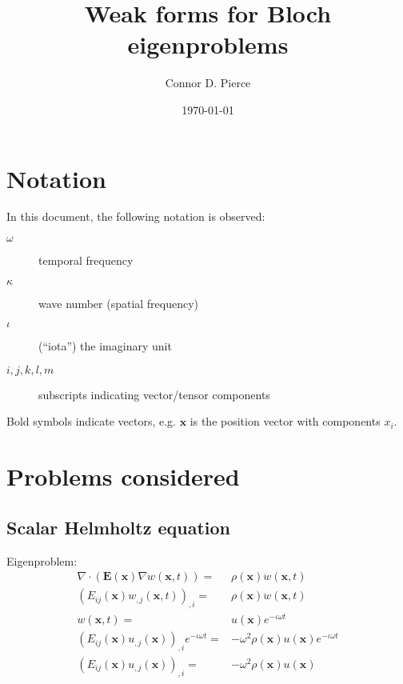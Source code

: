 \documentclass{article}
\title{Weak forms for Bloch eigenproblems}
\author{Connor D. Pierce}
\date{\today}
\numberwithin{equation}{section}
\newcommand{\imag}{\iota}
\newcommand{\vect}[1]{\boldsymbol{#1}}
\newcommand{\x}{x}
\newcommand{\vecx}{\vect{\x}}
\newcommand{\wavenum}{\kappa}
\begin{document}
\maketitle
\tableofcontents


\section{Notation}

In this document, the following notation is observed:
%
\begin{description}
    \item[$\omega$] temporal frequency
    \item[$\wavenum$] wave number (spatial frequency)
    \item[$\imag$] (``iota'') the imaginary unit
    \item[$i,j,k,l,m$] subscripts indicating vector/tensor components
\end{description}
%
Bold symbols indicate vectors, e.g. \(\vecx\) is the position vector with components \(\x_{i}\).


\section{Problems considered} \label{sec:prob}


\subsection{Scalar Helmholtz equation} \label{sec:prob.scalar}

Eigenproblem:
%
\begin{align}
    \nabla \cdot \left(
    \boldsymbol{E}(\vecx) \nabla w(\vecx, t)
    \right) =& \rho(\vecx) \ddot{w}(\vecx, t) \nonumber \\
    \left(
    E_{ij}(\vecx) w_{,j}(\vecx, t)
    \right)_{,i} =& \rho(\vecx) \ddot{w}(\vecx, t) \nonumber \\
    w(\vecx, t) =& u(\vecx) e^{-\imag \omega t} \nonumber \\
    \left(
        E_{ij}(\vecx) u_{,j}(\vecx)
    \right)_{,i} e^{-\imag \omega t} =& -\omega^2 \rho(\vecx) u(\vecx) e^{
        -\imag \omega t
    } \nonumber \\
    \left(
        E_{ij}(\vecx) u_{,j}(\vecx)
    \right)_{,i} =& -\omega^2 \rho(\vecx) u(\vecx) \label{eq:prob.scalar}
\end{align}
\end{document}

